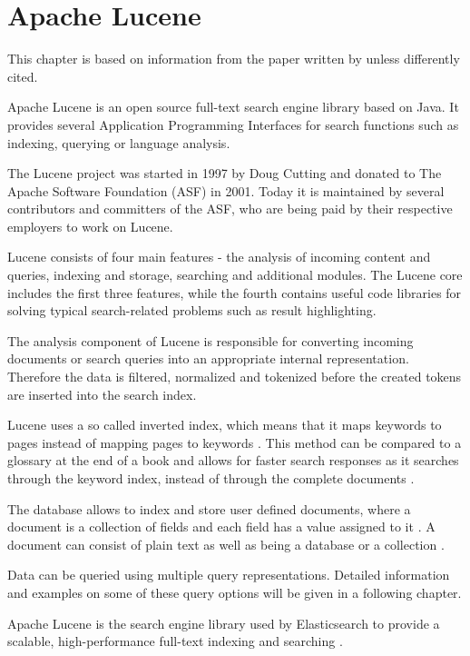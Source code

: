 \chapter{Apache Lucene}

This chapter is based on information from the paper written by \autocite{bialecki2012} unless differently cited.

Apache Lucene is an open source full-text search engine library based on Java. It provides several Application Programming Interfaces for search functions such as indexing, querying or language analysis. 

The Lucene project was started in 1997 by Doug Cutting and donated to The Apache Software Foundation (ASF) in 2001. Today it is maintained by several contributors and committers of the ASF, who are being paid by their respective employers to work on Lucene.

Lucene consists of four main features - the analysis of incoming content and queries, indexing and storage, searching and additional modules. The Lucene core includes the first three features, while the fourth contains useful code libraries for solving typical search-related problems such as result highlighting.

The analysis component of Lucene is responsible for converting incoming documents or search queries into an appropriate internal representation. Therefore the data is filtered, normalized and tokenized before the created tokens are inserted into the search index. 

Lucene uses a so called inverted index, which means that it maps keywords to pages instead of mapping pages to keywords \autocite{baeldung2018}. This method can be compared to a glossary at the end of a book and allows for faster search responses as it searches through the keyword index, instead of through the complete documents \autocite{baeldung2018}. 

The database allows to index and store user defined documents, where a document is a collection of fields and each field has a value assigned to it \autocite{baeldung2018}. A document can consist of plain text as well as being a database or a collection \autocite{baeldung2018}. 

Data can be queried using multiple query representations. Detailed information and examples on some of these query options will be given in a following chapter.    

Apache Lucene is the search engine library used by Elasticsearch to provide a scalable, high-performance full-text indexing and searching \autocite{tank.2019}.

